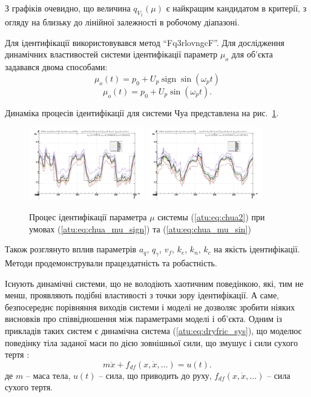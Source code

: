 \documentclass[a4paper,13pt]{atuaref}
\DeclareMathOperator*{\sign}{sign}
\begin{document}
З графіків очевидно, що величина $ q_{V_1} (\mu) $
є найкращим кандидатом в критерії, з огляду на близьку до лінійної залежності в робочому діапазоні.

Для ідентифікації використовувався метод ``Fq3rlovngcF''. Для
дослідження динамічних властивостей системи ідентифікації параметр $ \mu_o $
для об'єкта задавався двома способами:
%
\begin{equation}
 \mu_o(t) = p_0 + U_p \sign \sin( \omega_p t )
  \label{atu:eq:chua_mu_sign}
\end{equation}
%
\begin{equation}
 \mu_o(t) = p_0 + U_p \sin( \omega_p t ).
  \label{atu:eq:chua_mu_sin}
\end{equation}

Динаміка процесів ідентифікації для системи Чуа представлена на рис.~\ref{atu:f:chua_id}.

\begin{figure}[htb!]
\centerline{
  \includegraphics[width=0.45\textwidth]{p5/p/cha/chua/chua_m5p-pl_n_sign.png}
  \includegraphics[width=0.45\textwidth]{p5/p/cha/chua/chua_m5p-pl_n_sin.png}
}
\caption{Процес ідентифікації параметра $\mu$ системы (\ref{atu:eq:chua2})
  при умовах (\ref{atu:eq:chua_mu_sign}) та (\ref{atu:eq:chua_mu_sin})
}
\label{atu:f:chua_id}
\end{figure}

Також розглянуто вплив параметрів $a_q$, $q_\gamma$, $v_f$, $k_e$, $k_n$, $k_c$
на якість ідентифікації. Методи
продемонстрували працездатність та робастність.


Існують динамічні системи, що не володіють хаотичним поведінкою, які, тим не
менш, проявляють подібні властивості з точки зору ідентифікації. А саме,
безпосереднє порівняння виходів системи і моделі не дозволяє зробити ніяких
висновків про співвідношення між параметрами моделі і об'єкта. Одним із
прикладів таких систем є динамічна система (\ref{atu:eq:dryfric_sys}), що
моделює поведінку тіла заданої маси по дією зовнішньої сили, що змушує і сили
сухого тертя
\cite{atu_asau11}:
%
\begin{equation}
  m \ddot{x} + f_{df}( x, \dot{x}, \ldots)  = u(t).
\label{atu:eq:dryfric_sys}
\end{equation}
%
де
$m$ -- маса тела,
$u(t)$ -- сила, що приводить до руху,
$ f_{df}( x, \dot{x}, \ldots)  $ -- сила сухого тертя.
\end{document}
